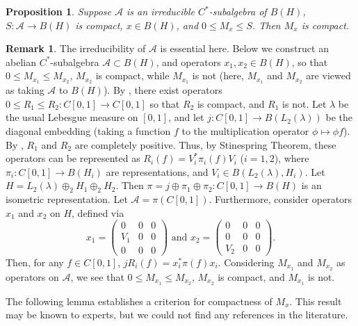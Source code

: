 \documentclass[12pt]{amsart}
\theoremstyle{plain}
\newtheorem{proposition}[theorem]{Proposition}
\theoremstyle{definition}
\newtheorem{remark}[theorem]{Remark}
\renewcommand{\leq}{\leqslant}
\newcommand{\A}{\mathcal{A}}
\begin{document}
\begin{proposition}\label{prop:above_multipl}
Suppose $\A$ is an irreducible $C^*$-subalgebra of $B(H)$,
$S : \A \to B(H)$ is compact, $x \in B(H)$, and $0 \leq M_x \leq S$.
Then $M_x$ is compact.
\end{proposition}

\begin{remark}\label{rem:irreduc}
The irreducibility of $\A$ is essential here. Below we construct an abelian
$C^*$-subalgebra $\A \subset B(H)$, and operators $x_1, x_2 \in B(H)$,
so that $0 \leq M_{x_1} \leq M_{x_2}$, $M_{x_2}$ is compact, while
$M_{x_1}$ is not (here, $M_{x_1}$ and $M_{x_2}$ are viewed as
taking $\A$ to $B(H)$). By \cite{Wi}, there
exist operators $0 \leq R_1 \leq R_2 : C[0,1] \to C[0,1]$ so that
$R_2$ is compact, and $R_1$ is not. Let $\lambda$ be the usual
Lebesgue measure on $[0,1]$, and let $j : C[0,1] \to B(L_2(\lambda))$
be the diagonal embedding (taking a function $f$ to the multiplication
operator $\phi \mapsto \phi f$). By \cite[Theorem 3.11]{Pa}, $R_1$ and $R_2$
are completely positive. Thus, by Stinespring Theorem, these operators
can be represented as $R_i(f) = V_i^* \pi_i(f) V_i$ ($i = 1,2$),
where $\pi_i : C[0,1] \to B(H_i)$ are representations, and
$V_i \in B(L_2(\lambda), H_i)$. Let $H = L_2(\lambda) \oplus_2 H_1 \oplus_2 H_2$.
Then $\pi = j \oplus \pi_1 \oplus \pi_2 : C[0,1] \to B(H)$
is an isometric representation. Let $\A = \pi(C[0,1])$. Furthermore,
consider operators $x_1$ and $x_2$ on $H$, defined via
$$
x_1 = \begin{pmatrix}  0 & 0 & 0 \\ V_1 & 0 & 0 \\ 0 & 0 & 0  \end{pmatrix}
\, \, {\mathrm{and}} \, \,
x_2 = \begin{pmatrix}  0 & 0 & 0 \\ 0 & 0 & 0 \\ V_2 & 0 & 0  \end{pmatrix} .
$$
Then, for any $f \in C[0,1]$, $j R_i(f) = x_i^* \pi(f) x_i$.
Considering $M_{x_1}$ and $M_{x_2}$ as
operators on $\A$, we see that $0 \leq M_{x_1} \leq M_{x_2}$,
$M_{x_2}$ is compact, and $M_{x_1}$ is not.
\end{remark}



The following lemma establishes
a criterion for compactness of $M_x$. This result may be known to experts,
but we could not find any references in the literature.
\end{document}
